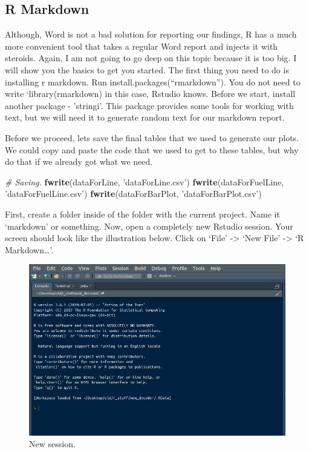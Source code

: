 \documentclass[]{book}
\newenvironment{Shaded}{\begin{snugshade}}{\end{snugshade}}
\newcommand{\CommentTok}[1]{\textcolor[rgb]{0.56,0.35,0.01}{\textit{#1}}}
\newcommand{\KeywordTok}[1]{\textcolor[rgb]{0.13,0.29,0.53}{\textbf{#1}}}
\newcommand{\NormalTok}[1]{#1}
\newcommand{\StringTok}[1]{\textcolor[rgb]{0.31,0.60,0.02}{#1}}
\begin{document}
\hypertarget{r-markdown}{%
\subsection{R Markdown}\label{r-markdown}}

Although, Word is not a bad solution for reporting our findings, R has a much more convenient tool that takes a regular Word report and injects it with steroids. Again, I am not going to go deep on this topic because it is too big. I will show you the basics to get you started. The first thing you need to do is installing r markdown. Run install.packages(``rmarkdown''). You do not need to write `library(rmarkdown) in this case, Rstudio knows. Before we start, install another package - 'stringi'. This package provides some tools for working with text, but we will need it to generate random text for our markdown report.

Before we proceed, lets save the final tables that we used to generate our plots. We could copy and paste the code that we used to get to these tables, but why do that if we already got what we need.

\begin{Shaded}
\begin{Highlighting}[]
\CommentTok{# Saving.}
\KeywordTok{fwrite}\NormalTok{(dataForLine, }\StringTok{'dataForLine.csv'}\NormalTok{)}
\KeywordTok{fwrite}\NormalTok{(dataForFuelLine, }\StringTok{'dataForFuelLine.csv'}\NormalTok{)}
\KeywordTok{fwrite}\NormalTok{(dataForBarPlot, }\StringTok{'dataForBarPlot.csv'}\NormalTok{)}
\end{Highlighting}
\end{Shaded}

First, create a folder inside of the folder with the current project. Name it `markdown' or something. Now, open a completely new Rstudio session. Your screen should look like the illustration below. Click on `File' -\textgreater{} `New File' -\textgreater{} `R Markdown\ldots{}'.

\begin{figure}
\centering
\includegraphics{newSession.png}
\caption{New session.}
\end{figure}
\end{document}
